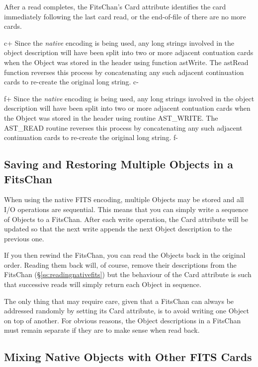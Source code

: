 \documentclass[twoside,11pt]{starlink}
\providecommand{\secref}[1]{\S\ref{#1}}
\begin{document}
After a read completes, the FitsChan's Card attribute identifies the
card immediately following the last card read, or the end-of-file of
there are no more cards.

c+
Since the \emph{native} encoding is being used, any long strings involved
in the object description will have been split into two or more adjacent
contuation cards when the Object was stored in the header using function
astWrite. The astRead function reverses this process by concatenating any
such adjacent continuation cards to re-create the original long string.
c-

f+
Since the \emph{native} encoding is being used, any long strings involved
in the object description will have been split into two or more adjacent
contuation cards when the Object was stored in the header using routine
AST\_WRITE. The AST\_READ routine reverses this process by concatenating
any such adjacent continuation cards to re-create the original long
string.
f-

\subsection{Saving and Restoring Multiple Objects in a FitsChan}

When using the native FITS encoding, multiple Objects may be stored
and all I/O operations are sequential.  This means that you can simply
write a sequence of Objects to a FitsChan. After each write operation,
the Card attribute will be updated so that the next write appends the
next Object description to the previous one.

If you then rewind the FitsChan, you can read the Objects back in the
original order. Reading them back will, of course, remove their
descriptions from the FitsChan (\secref{ss:readingnativefits}) but the
behaviour of the Card attribute is such that successive reads will
simply return each Object in sequence.

The only thing that may require care, given that a FitsChan can always
be addressed randomly by setting its Card attribute, is to avoid
writing one Object on top of another. For obvious reasons, the Object
descriptions in a FitsChan must remain separate if they are to make
sense when read back.

\subsection{Mixing Native Objects with Other FITS Cards}
\end{document}
